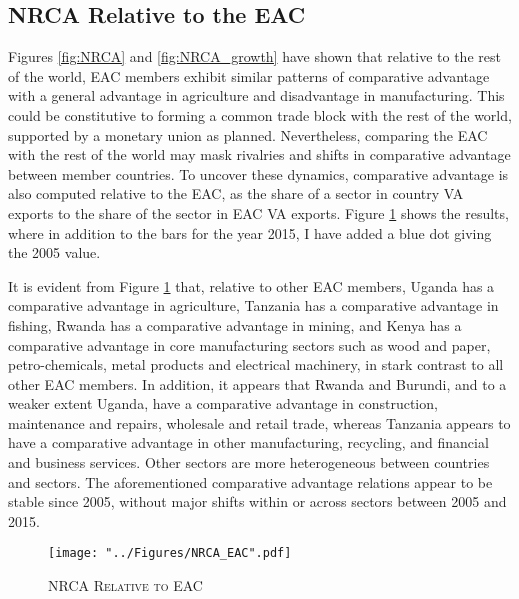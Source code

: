 \documentclass[a4paper]{article}
\begin{document}
\subsection{NRCA Relative to the EAC}
Figures \ref{fig:NRCA} and \ref{fig:NRCA_growth} have shown that relative to the rest of the world, EAC members exhibit similar patterns of comparative advantage with a general advantage in agriculture and disadvantage in manufacturing. This could be constitutive to forming a common trade block with the rest of the world, supported by a monetary union as planned. Nevertheless, comparing the EAC with the rest of the world may mask rivalries and shifts in comparative advantage between member countries. To uncover these dynamics, comparative advantage is also computed relative to the EAC, as the share of a sector in country VA exports to the share of the sector in EAC VA exports. %
Figure \ref{fig:NRCA_EAC} shows the results, where in addition to the bars for the year 2015, I have added a blue dot giving the 2005 value. \newline %

It is evident from Figure \ref{fig:NRCA_EAC} that, relative to other EAC members, Uganda has a comparative advantage in agriculture, Tanzania has a comparative advantage in fishing, Rwanda has a comparative advantage in mining, and Kenya has a comparative advantage in core manufacturing sectors such as wood and paper, petro-chemicals, metal products and electrical machinery, in stark contrast to all other EAC members. In addition, it appears that Rwanda and Burundi, and to a weaker extent Uganda, have a comparative advantage in construction, maintenance and repairs, wholesale and retail trade, whereas Tanzania appears to have a comparative advantage in other manufacturing, recycling, and financial and business services. Other sectors are more heterogeneous between countries and sectors. The aforementioned comparative advantage relations appear to be stable since 2005, without major shifts within or across sectors between 2005 and 2015. \newline 

\begin{figure}[h!]
\centering
\caption{\label{fig:NRCA_EAC}\textsc{NRCA Relative to EAC}}
\texttt{[image: "../Figures/NRCA\_EAC".pdf]} %
\end{figure}
\FloatBarrier
\end{document}
